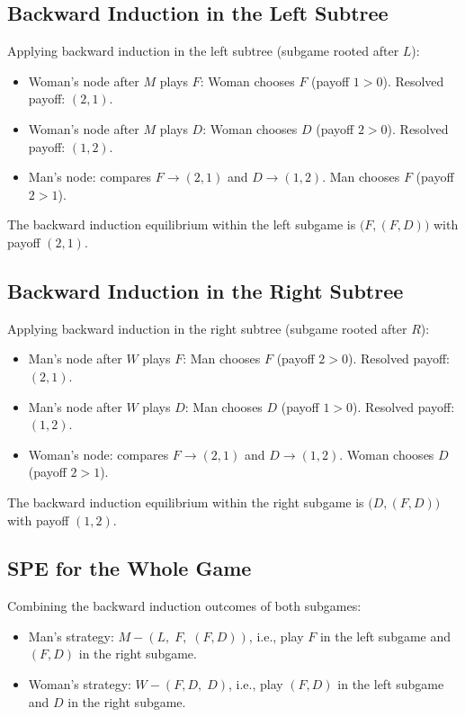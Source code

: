 \documentclass[12pt, a4paper]{article}
\begin{document}
\subsection{Backward Induction in the Left Subtree}

\noindent Applying backward induction in the left subtree (subgame rooted after $L$):
\begin{itemize}
  \item Woman's node after $M$ plays $F$: Woman chooses $F$ (payoff $1 > 0$). Resolved payoff: $(2,1)$.
  \item Woman's node after $M$ plays $D$: Woman chooses $D$ (payoff $2 > 0$). Resolved payoff: $(1,2)$.
  \item Man's node: compares $F \to (2,1)$ and $D \to (1,2)$. Man chooses $F$ (payoff $2 > 1$).
\end{itemize}
\noindent The backward induction equilibrium within the left subgame is $\bigl(F, (F,D)\bigr)$ with payoff $(2,1)$.

\subsection{Backward Induction in the Right Subtree}

\noindent Applying backward induction in the right subtree (subgame rooted after $R$):
\begin{itemize}
  \item Man's node after $W$ plays $F$: Man chooses $F$ (payoff $2 > 0$). Resolved payoff: $(2,1)$.
  \item Man's node after $W$ plays $D$: Man chooses $D$ (payoff $1 > 0$). Resolved payoff: $(1,2)$.
  \item Woman's node: compares $F \to (2,1)$ and $D \to (1,2)$. Woman chooses $D$ (payoff $2 > 1$).
\end{itemize}
\noindent The backward induction equilibrium within the right subgame is $\bigl(D, (F,D)\bigr)$ with payoff $(1,2)$.

\subsection{SPE for the Whole Game}

Combining the backward induction outcomes of both subgames:
\begin{itemize}
  \item Man's strategy: $M - (L,\; F,\; (F,D))$, i.e., play $F$ in the left subgame and $(F,D)$ in the right subgame.
  \item Woman's strategy: $W - (F,D,\; D)$, i.e., play $(F,D)$ in the left subgame and $D$ in the right subgame.
\end{itemize}
\end{document}
